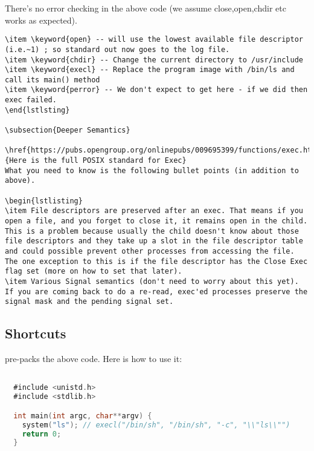 There's no error checking in the above code (we assume close,open,chdir etc works as expected). 

\begin{lstlisting}
\item \keyword{open} -- will use the lowest available file descriptor (i.e.~1) ; so standard out now goes to the log file. 
\item \keyword{chdir} -- Change the current directory to /usr/include 
\item \keyword{execl} -- Replace the program image with /bin/ls and call its main() method 
\item \keyword{perror} -- We don't expect to get here - if we did then exec failed.
\end{lstlsting}

\subsection{Deeper Semantics}

\href{https://pubs.opengroup.org/onlinepubs/009695399/functions/exec.html}{Here is the full POSIX standard for Exec}
What you need to know is the following bullet points (in addition to above).

\begin{lstlisting}
\item File descriptors are preserved after an exec. That means if you open a file, and you forget to close it, it remains open in the child.
This is a problem because usually the child doesn't know about those file descriptors and they take up a slot in the file descriptor table and could possible prevent other processes from accessing the file. The one exception to this is if the file descriptor has the Close Exec flag set (more on how to set that later).
\item Various Signal semantics (don't need to worry about this yet). If you are coming back to do a re-read, exec'ed processes preserve the signal mask and the pending signal set.
\end{lstlisting}

\subsection{Shortcuts}

 pre-packs the above code. Here is how to use it:

\begin{lstlisting}[language=C]

  #include <unistd.h>
  #include <stdlib.h>

  int main(int argc, char**argv) {
    system("ls"); // execl("/bin/sh", "/bin/sh", "-c", "\\"ls\\"")
    return 0;
  }
\end{lstlisting}

